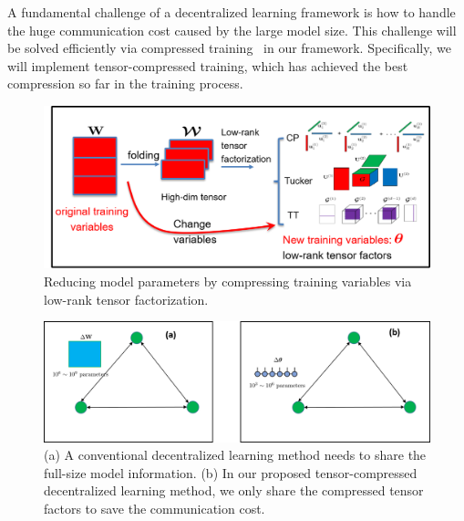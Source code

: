 \documentclass[11pt,letterpaper]{article}
\begin{document}
A fundamental challenge of a decentralized learning framework is how to handle the huge communication cost caused by the large model size. This challenge will be solved efficiently via compressed training~\cite{hawkins2022towards,hawkins2021bayesian} in our framework. Specifically, we will implement tensor-compressed training, which has achieved the best compression so far in the training process.
\begin{figure}[t]
\centering
	\includegraphics[width=6in]{fig/tensor_compression.png}
\caption{Reducing model parameters by compressing training variables via low-rank tensor factorization. } 
\label{fig:aws_overview}
\end{figure}

\begin{figure}[t]
\centering
	\includegraphics[width=6in]{fig/TT_FL.png}
\caption{(a) A conventional decentralized learning method needs to share the full-size model information. (b) In our proposed tensor-compressed decentralized learning method, we only share the compressed tensor factors to save the communication cost. } 
\label{fig:TT_FL}
\vspace{-10pt}
\end{figure}
\end{document}
